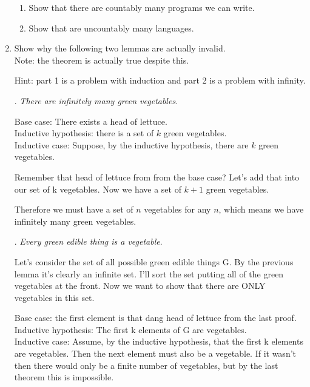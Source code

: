 \documentclass[basic, header]{nosvagor-notes}
\begin{document}
\begin{enumerate}[itemsep=4em]
    \begin{enumerate}[leftmargin=2em]

      \item Show that there are countably many programs we can write.

      \item Show that are uncountably many languages.

    \end{enumerate}

  \newpage %

  \item Show why the following two lemmas are actually invalid.\\

    Note: the theorem is actually true despite this.

    Hint: part 1 is a problem with induction and part 2 is a problem with
    infinity.

    . \textit{There are infinitely many green vegetables}.


    Base case: There exists a head of lettuce.\\
    Inductive hypothesis: there is a set of \(k\) green vegetables.\\
    Inductive case: Suppose, by the inductive hypothesis, there are \(k\) green vegetables.

    Remember that head of lettuce from from the base case? Let’s add that into our set of k vegetables.
    Now we have a set of \(k + 1\) green vegetables.

    Therefore we must have a set of \(n\) vegetables for any \(n\), which means
    we have infinitely many green vegetables. \tqed

    . \textit{Every green edible thing is a vegetable}.


    Let’s consider the set of all possible green edible things G. By the
    previous lemma it’s clearly an infinite set. I’ll sort the set putting all
    of the green vegetables at the front. Now we want to show that there are
    ONLY vegetables in this set.

    Base case: the first element is that dang head of lettuce from the last
    proof.\\ Inductive hypothesis: The first k elements of G are vegetables.\\
    Inductive case: Assume, by the inductive hypothesis, that the first k
    elements are vegetables. Then the next element must also be a vegetable. If
    it wasn't then there would only be a finite number of vegetables, but by
    the last theorem this is impossible.


\end{enumerate}
\end{document}
